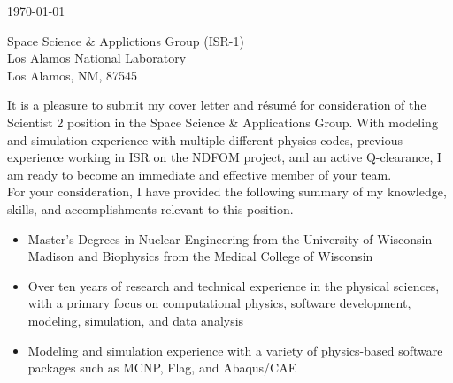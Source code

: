 
\begin{center}
\begin{minipage}{\textwidth}

  \normalsize

  \vspace{6mm} 

  \today \\
  \vspace{4mm}
	
	Space Science \& Applictions Group (ISR-1) \\
	Los Alamos National Laboratory \\
	Los Alamos, NM, 87545 \\
  
  \vspace{4mm} 


	It is a pleasure to submit my cover letter and r\'{e}sum\'{e} for consideration of the Scientist 2 position in the Space Science \& Applications Group.
	With modeling and simulation experience with multiple different physics codes, previous experience working in ISR on the NDFOM project, and an active Q-clearance, I am ready to become an immediate and effective member of your team. \\

  For your consideration, I have provided the following summary of my knowledge, skills, and accomplishments relevant to this position. \\

  \begin{itemize}[leftmargin=.45in,rightmargin=.45in,itemsep=1.6mm]

	\item Master's Degrees in Nuclear Engineering from the University of Wisconsin - Madison and Biophysics from the Medical College of Wisconsin

	\item Over ten years of research and technical experience in the physical sciences, with a primary focus on computational physics, software development, modeling, simulation, and data analysis

	\item Modeling and simulation experience with a variety of physics-based software packages such as MCNP, Flag, and Abaqus/CAE


\end{itemize}
\end{minipage}
\end{center}
